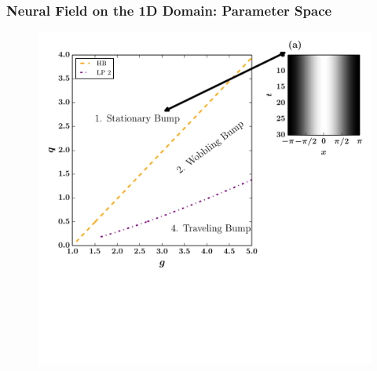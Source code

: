 \documentclass{beamer}
\begin{document}

\subsubsection{}

\begin{frame}
\frametitle{Neural Field on the 1D Domain: Parameter Space}
\begin{figure}
 \includegraphics[width=.6\textwidth]{oned_full_2par1.pdf}
\end{figure}
\end{frame}
\end{document}
